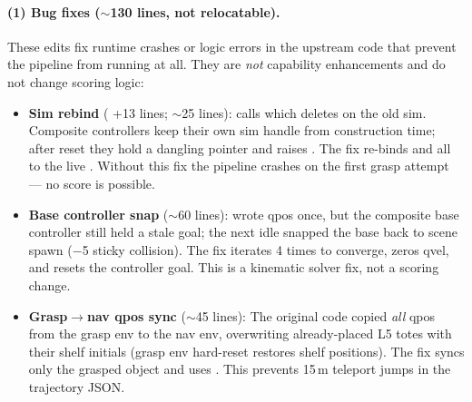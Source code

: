 \paragraph{(1) Bug fixes ($\sim$130 lines, not relocatable).}
These edits fix runtime crashes or logic errors in the upstream code that
prevent the pipeline from running at all.  They are \emph{not} capability
enhancements and do not change scoring logic:
\begin{itemize}[leftmargin=*,itemsep=2pt]
    \item \textbf{Sim rebind} ( +13 lines;
     $\sim$25 lines):
     calls  which deletes 
    on the old sim.  Composite controllers keep their own sim handle from
    construction time; after reset they hold a dangling pointer and
     raises .  The fix
    re-binds  and all
     to the live .  Without this
    fix the pipeline crashes on the first grasp attempt --- no score is
    possible.
    \item \textbf{Base controller snap} ($\sim$60 lines):
     wrote qpos once, but the composite base
    controller still held a stale goal; the next idle  snapped the
    base back to scene spawn ($-$5 sticky collision).  The fix iterates 4
    times to converge, zeros qvel, and resets the controller goal.  This is a
    kinematic solver fix, not a scoring change.
    \item \textbf{Grasp$\to$nav qpos sync} ($\sim$45 lines):
    The original code copied \emph{all}  qpos from the
    grasp env to the nav env, overwriting already-placed L5 totes with their
    shelf initials (grasp env hard-reset restores shelf positions).  The fix
    syncs only the grasped object and uses
    .  This prevents
    15\,m teleport jumps in the trajectory JSON.
\end{itemize}

